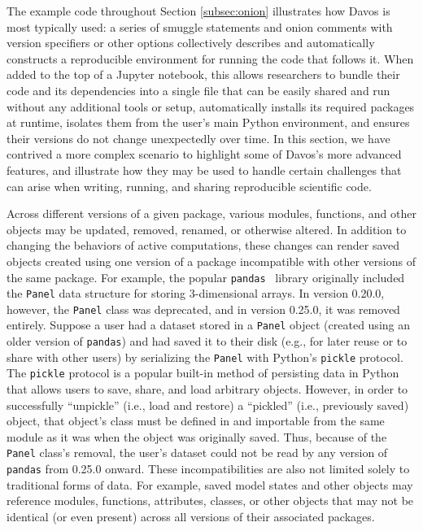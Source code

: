 \documentclass[preprint,12pt,a4paper]{elsarticle}
\begin{document}
The example code throughout Section \ref{subsec:onion} illustrates how Davos is most typically used: a series of smuggle statements and onion comments with version specifiers or other options collectively describes and automatically constructs a reproducible environment for running the code that follows it.
When added to the top of a Jupyter notebook, this allows researchers to bundle their code and its dependencies into a single file that can be easily shared and run without any additional tools or setup, automatically installs its required packages at runtime, isolates them from the user's main Python environment, and ensures their versions do not change unexpectedly over time.
In this section, we have contrived a more complex scenario to highlight some of Davos's more advanced features, and illustrate how they may be used to handle certain challenges that can arise when writing, running, and sharing reproducible scientific code.

Across different versions of a given package, various modules, functions,
and other objects may be updated, removed, renamed, or otherwise altered. In
addition to changing the behaviors of active computations, these changes can
render saved objects created using one version of a package incompatible with
other versions of the same package. For example, the popular
\texttt{pandas}~\cite{McKi10} library originally included the \texttt{Panel} data
structure for storing 3-dimensional arrays. In version 0.20.0, however, the
\texttt{Panel} class was deprecated, and in version 0.25.0, it was removed
entirely. Suppose a user had a dataset stored in a \texttt{Panel} object
(created using an older version of \texttt{pandas}) and had saved it to their
disk (e.g., for later reuse or to share with other users) by serializing the
\texttt{Panel} with Python's \texttt{pickle} protocol. The \texttt{pickle}
protocol is a popular built-in method of persisting data in Python that allows
users to save, share, and load arbitrary objects. However, in order to
successfully ``unpickle'' (i.e., load and restore) a ``pickled'' (i.e., previously saved)
object, that object's class must be defined in and importable from the same
module as it was when the object was originally saved. Thus, because of the \texttt{Panel} class's
removal, the user's dataset could not be read by any version of \texttt{pandas}
from 0.25.0 onward. These incompatibilities are also not limited solely to
traditional forms of data. For example, saved model states and other objects
may reference modules, functions, attributes, classes, or other objects that
may not be identical (or even present) across all versions of their associated
packages.
\end{document}
